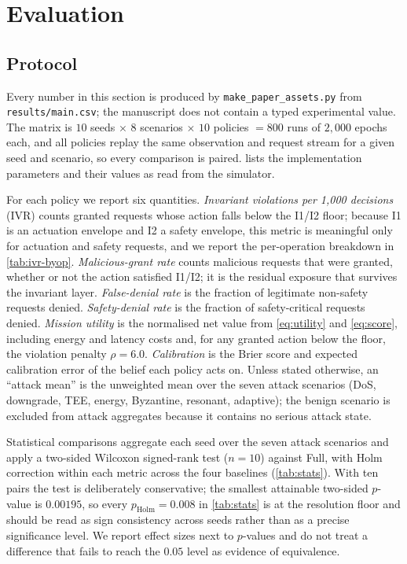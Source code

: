 \section{Evaluation}
\label{sec:evaluation}

\subsection{Protocol}
\label{sec:eval-protocol}

Every number in this section is produced by \texttt{make\_paper\_assets.py} from
\texttt{results/main.csv}; the manuscript does not contain a typed experimental
value. The matrix is $10$ seeds $\times$ $8$ scenarios $\times$ $10$ policies
$=800$ runs of $2{,}000$ epochs each, and all policies replay the same
observation and request stream for a given seed and scenario, so every
comparison is paired.  lists the implementation parameters and
their values as read from the simulator.

For each policy we report six quantities. \emph{Invariant violations per
1{,}000 decisions} (IVR) counts granted requests whose action falls below the
I1/I2 floor; because I1 is an actuation envelope and I2 a safety envelope, this
metric is meaningful only for actuation and safety requests, and we report the
per-operation breakdown in \cref{tab:ivr-byop}. \emph{Malicious-grant rate}
counts malicious requests that were granted, whether or not the action satisfied
I1/I2; it is the residual exposure that survives the invariant layer.
\emph{False-denial rate} is the fraction of legitimate non-safety requests
denied. \emph{Safety-denial rate} is the fraction of safety-critical requests
denied. \emph{Mission utility} is the normalised net value from
\eqref{eq:utility} and \eqref{eq:score}, including energy and latency costs and,
for any granted action below the floor, the violation penalty $\rho=6.0$.
\emph{Calibration} is the Brier score and expected calibration error of the
belief each policy acts on. Unless stated otherwise, an ``attack mean'' is the
unweighted mean over the seven attack scenarios (DoS, downgrade, TEE, energy,
Byzantine, resonant, adaptive); the benign scenario is excluded from attack
aggregates because it contains no serious attack state.

Statistical comparisons aggregate each seed over the seven attack scenarios and
apply a two-sided Wilcoxon signed-rank test ($n=10$) against Full, with Holm
correction within each metric across the four baselines
(\cref{tab:stats}). With ten pairs the test is deliberately conservative; the smallest attainable
two-sided $p$-value is $0.00195$, so every $p_{\text{Holm}}=0.008$ in
\cref{tab:stats} is at the resolution floor and should be read as sign
consistency across seeds rather than as a precise significance level. We report
effect sizes next to $p$-values and do not treat a difference that fails to reach
the $0.05$ level as evidence of equivalence.


